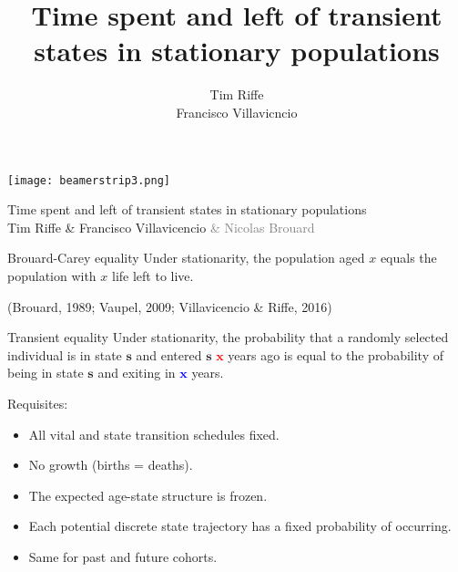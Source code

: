 \documentclass[20pt,usenames,dvipsnames]{beamer}
\title{Time spent and left of transient states in
stationary populations}
\subtitle{Tim Riffe \\ Francisco Villavicncio}		%
\begin{document}

\begin{frame}[plain]
	\vspace{-3cm}
 \centerline{\texttt{[image: beamerstrip3.png]}}

	
	\huge
	\vspace{1em}
	
	Time spent and left of transient states in stationary populations\\
	\vspace{1em}
	\large 
	Tim Riffe \& Francisco Villavicencio \textcolor{gray}{\& Nicolas Brouard}
\end{frame}


\begin{frame}[plain]
\Large
 \begin{block}{Brouard-Carey equality}
  Under stationarity, the population aged $x$ equals the population with $x$ life left to live.\\ 
 \end{block}
\small{(Brouard, 1989; Vaupel, 2009; Villavicencio \& Riffe, 2016)}
\pause
 \begin{block}{Transient equality}
  Under stationarity, the probability that a randomly selected individual is in
  state \textcolor{OliveGreen}{$\mathbf{s}$} and entered
  \textcolor{OliveGreen}{$\mathbf{s}$} \textcolor{red}{$\mathbf{x}$} years ago
  is equal to the probability of being in state
  \textcolor{OliveGreen}{$\mathbf{s}$} and exiting in
  \textcolor{blue}{$\mathbf{x}$} years.
 \end{block}
\end{frame}

\begin{frame}[plain]
\Large
\centering
Requisites:
\begin{itemize}[<+->]
\item All vital and state transition schedules fixed.
\item No growth (births = deaths).
\item The expected age-state structure is frozen.
\item Each potential discrete state trajectory has a fixed probability of
occurring.
\item Same for past and future cohorts.
\end{itemize}
\end{frame}
\end{document}
